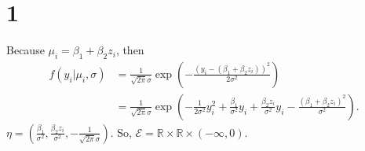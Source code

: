 \documentclass[en,12pt]{elegantpaper}
\begin{document}
    \section*{1}
    \noindent Because $\mu_i=\beta_1+\beta_2z_i$, then
    \begin{align*}
        f(y_i|\mu_i,\sigma)&=\frac{1}{\sqrt{2\pi}\sigma}\exp\left(-\frac{(y_i-(\beta_1+\beta_2z_i))^2}{2\sigma^2}\right)\\
        &=\frac{1}{\sqrt{2\pi}\sigma}\exp\left(-\frac{1}{2\sigma^2}y_i^2+\frac{\beta_1}{\sigma^2}y_i+\frac{\beta_2z_i}{\sigma^2}y_i-\frac{(\beta_1+\beta_2z_i)^2}{\sigma^2}\right). 
    \end{align*}
    $\eta=(\frac{\beta_1}{\sigma^2}, \frac{\beta_2z_i}{\sigma^2}, -\frac{1}{\sqrt{2\pi}\sigma})$. So, $\mathcal{E}=\mathbb{R}\times\mathbb{R}\times(-\infty,0)$. 
\end{document}
